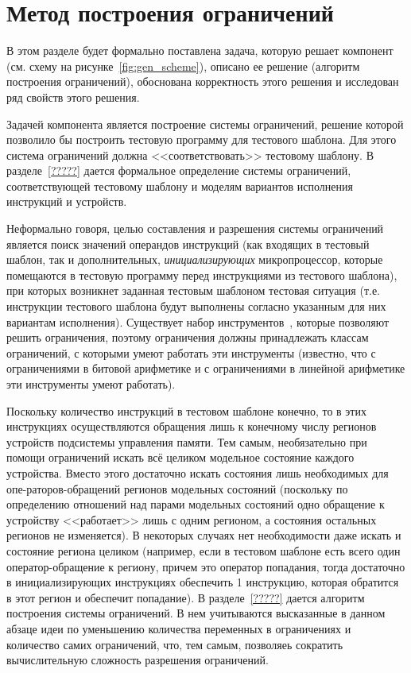\section{Метод построения ограничений}\label{sec:constraints_generation_section}

В этом разделе будет формально поставлена задача, которую решает компонент  (см. схему на рисунке~\ref{fig:gen_scheme}), описано ее решение (алгоритм построения ограничений), обоснована корректность этого решения и исследован ряд свойств этого решения.

Задачей компонента  является построение системы ограничений, решение которой позволило бы построить тестовую программу для тестового шаблона. Для этого система ограничений должна <<соответствовать>> тестовому шаблону. В разделе~\ref{?????} дается формальное определение системы ограничений, соответствующей тестовому шаблону и моделям вариантов исполнения инструкций и устройств.

Неформально говоря, целью составления и разрешения системы ограничений является поиск значений операндов инструкций (как входящих в тестовый шаблон, так и дополнительных, \emph{инициализирующих} микропроцессор, которые помещаются в тестовую программу перед инструкциями из тестового шаблона), при которых возникнет заданная тестовым шаблоном тестовая ситуация (т.е. инструкции тестового шаблона будут выполнены согласно указанным для них вариантам исполнения).  Существует набор инструментов~\cite{Z3, Yices}, которые позволяют решить ограничения, поэтому ограничения должны принадлежать классам ограничений, с которыми умеют работать эти инструменты (известно, что с ограничениями в битовой арифметике и с ограничениями в линейной арифметике эти инструменты умеют работать).

Поскольку количество инструкций в тестовом шаблоне конечно, то в этих инструкциях осуществляются обращения лишь к конечному числу регионов устройств подсистемы управления памяти. Тем самым, необязательно при помощи ограничений искать всё целиком модельное состояние каждого устройства. Вместо этого достаточно искать состояния лишь необходимых для опе-раторов-обращений регионов модельных состояний (поскольку по определению отношений над парами модельных состояний одно обращение к устройству <<работает>> лишь с одним регионом, а состояния остальных регионов не изменяется). В некоторых случаях нет необходимости даже искать и состояние региона целиком (например, если в тестовом шаблоне есть всего один оператор-обращение к региону, причем это оператор попадания, тогда достаточно в инициализирующих инструкциях обеспечить 1 инструкцию, которая обратится в этот регион и обеспечит попадание). В разделе~\ref{?????} дается алгоритм построения системы ограничений. В нем учитываются высказанные в данном абзаце идеи по уменьшению количества переменных в ограничениях и количество самих ограничений, что, тем самым, позволяеь сократить вычислительную сложность разрешения ограничений.

